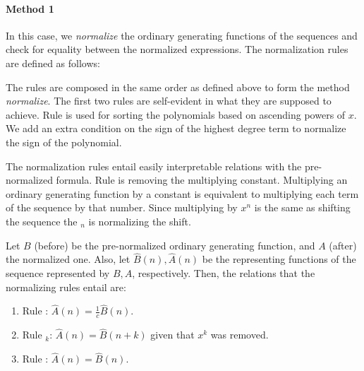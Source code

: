 \paragraph{Method 1} In this case, we \emph{normalize} the ordinary generating functions of the sequences and check
for equality between the normalized expressions.
The normalization rules are defined as follows:

    \begin{prooftree}
    \end{prooftree}

    \begin{prooftree}
    \end{prooftree}

    \begin{prooftree}
    \end{prooftree}

The rules are composed in the same order as defined above to form the method \emph{normalize}.
The first two rules are self-evident in what they are supposed to achieve. Rule  is used for sorting
the polynomials based on ascending powers of $x$. We add an extra condition on the sign of the highest degree term to
 normalize the sign of the polynomial.

The normalization rules entail easily interpretable relations with the pre-normalized formula. Rule 
is removing the multiplying constant. Multiplying an ordinary generating function by a constant is equivalent to
multiplying each term of the sequence by that number.
Since multiplying by $x^n$ is the same as shifting the sequence the $_n$ is normalizing the shift.

Let $B$ (before) be the pre-normalized ordinary generating function, and $A$ (after) the normalized one. Also, let
$\hat{B}(n), \hat{A}(n)$ be the representing functions of the sequence represented by $B,A$, respectively. Then, the
relations that the normalizing rules entail are:

\begin{enumerate}
\item Rule : $\hat{A}(n) = \frac{1}{c}\hat{B}(n)$.
\item Rule $_k$: $\hat{A}(n) = \hat{B}(n+k)$ given that $x^k$ was removed.
\item Rule : $\hat{A}(n) = \hat{B}(n)$.
\end{enumerate}

